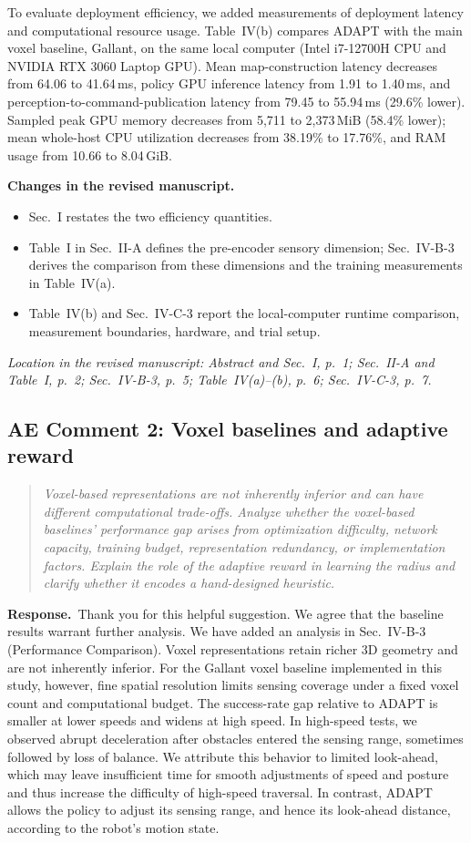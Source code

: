 \documentclass[11pt]{article}
\newenvironment{reviewcomment}{\begin{quote}\color{reviewblue}\itshape}{\end{quote}}
\newcommand{\Response}{\par\noindent\textbf{Response.}\ }
\newcommand{\Changes}{\par\noindent\textbf{Changes in the revised manuscript.}\ }
\newcommand{\Location}[1]{\par\noindent\textit{Location in the revised manuscript: #1}}
\begin{document}
To evaluate deployment efficiency, we added measurements of deployment latency and computational resource usage. Table~IV(b) compares ADAPT with the main voxel baseline, Gallant, on the same local computer (Intel i7-12700H CPU and NVIDIA RTX 3060 Laptop GPU). Mean map-construction latency decreases from 64.06 to 41.64\,ms, policy GPU inference latency from 1.91 to 1.40\,ms, and perception-to-command-publication latency from 79.45 to 55.94\,ms (29.6\% lower). Sampled peak GPU memory decreases from 5,711 to 2,373\,MiB (58.4\% lower); mean whole-host CPU utilization decreases from 38.19\% to 17.76\%, and RAM usage from 10.66 to 8.04\,GiB.
\Changes
\begin{itemize}
    \item Sec.~I restates the two efficiency quantities.
    \item Table~I in Sec.~II-A defines the pre-encoder sensory dimension; Sec.~IV-B-3 derives the comparison from these dimensions and the training measurements in Table~IV(a).
    \item Table~IV(b) and Sec.~IV-C-3 report the local-computer runtime comparison, measurement boundaries, hardware, and trial setup.
\end{itemize}
\Location{Abstract and Sec.~I, p.~1; Sec.~II-A and Table~I, p.~2; Sec.~IV-B-3, p.~5; Table~IV(a)--(b), p.~6; Sec.~IV-C-3, p.~7.}



\subsection*{AE Comment 2: Voxel baselines and adaptive reward}
\begin{reviewcomment}
Voxel-based representations are not inherently inferior and can have different computational trade-offs. Analyze whether the voxel-based baselines' performance gap arises from optimization difficulty, network capacity, training budget, representation redundancy, or implementation factors. Explain the role of the adaptive reward in learning the radius and clarify whether it encodes a hand-designed heuristic.
\end{reviewcomment}
\Response Thank you for this helpful suggestion. We agree that the baseline results warrant further analysis. We have added an analysis in Sec.~IV-B-3 (Performance Comparison). Voxel representations retain richer 3D geometry and are not inherently inferior. For the Gallant voxel baseline implemented in this study, however, fine spatial resolution limits sensing coverage under a fixed voxel count and computational budget. The success-rate gap relative to ADAPT is smaller at lower speeds and widens at high speed. In high-speed tests, we observed abrupt deceleration after obstacles entered the sensing range, sometimes followed by loss of balance. We attribute this behavior to limited look-ahead, which may leave insufficient time for smooth adjustments of speed and posture and thus increase the difficulty of high-speed traversal. In contrast, ADAPT allows the policy to adjust its sensing range, and hence its look-ahead distance, according to the robot's motion state.
\end{document}
